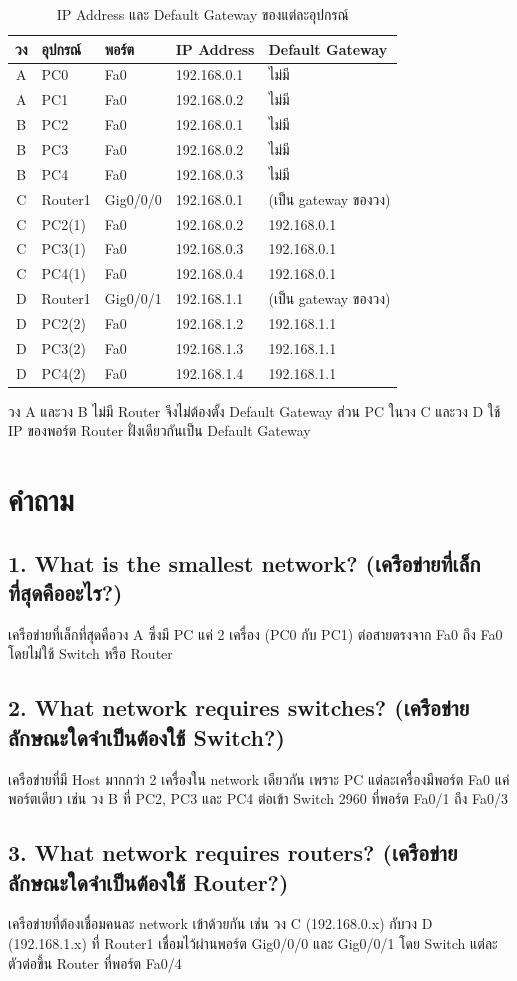 \begin{table}[h]
  \centering
  \caption{IP Address และ Default Gateway ของแต่ละอุปกรณ์}
  \label{tab:ip}
  \begin{tabular}{cllll}
    \toprule
    วง & อุปกรณ์ & พอร์ต & IP Address & Default Gateway \\
    \midrule
    A & PC0     & Fa0      & 192.168.0.1 & ไม่มี \\
    A & PC1     & Fa0      & 192.168.0.2 & ไม่มี \\
    \midrule
    B & PC2     & Fa0      & 192.168.0.1 & ไม่มี \\
    B & PC3     & Fa0      & 192.168.0.2 & ไม่มี \\
    B & PC4     & Fa0      & 192.168.0.3 & ไม่มี \\
    \midrule
    C & Router1 & Gig0/0/0 & 192.168.0.1 & (เป็น gateway ของวง) \\
    C & PC2(1)  & Fa0      & 192.168.0.2 & 192.168.0.1 \\
    C & PC3(1)  & Fa0      & 192.168.0.3 & 192.168.0.1 \\
    C & PC4(1)  & Fa0      & 192.168.0.4 & 192.168.0.1 \\
    \midrule
    D & Router1 & Gig0/0/1 & 192.168.1.1 & (เป็น gateway ของวง) \\
    D & PC2(2)  & Fa0      & 192.168.1.2 & 192.168.1.1 \\
    D & PC3(2)  & Fa0      & 192.168.1.3 & 192.168.1.1 \\
    D & PC4(2)  & Fa0      & 192.168.1.4 & 192.168.1.1 \\
    \bottomrule
  \end{tabular}
\end{table}

วง A และวง B ไม่มี Router จึงไม่ต้องตั้ง Default Gateway ส่วน PC ในวง C และวง D ใช้ IP ของพอร์ต Router ฝั่งเดียวกันเป็น Default Gateway

\section{คำถาม}

\subsection*{1. What is the smallest network? (เครือข่ายที่เล็กที่สุดคืออะไร?)}
เครือข่ายที่เล็กที่สุดคือวง A ซึ่งมี PC แค่ 2 เครื่อง (PC0 กับ PC1) ต่อสายตรงจาก Fa0 ถึง Fa0 โดยไม่ใช้ Switch หรือ Router

\subsection*{2. What network requires switches? (เครือข่ายลักษณะใดจำเป็นต้องใช้ Switch?)}
เครือข่ายที่มี Host มากกว่า 2 เครื่องใน network เดียวกัน เพราะ PC แต่ละเครื่องมีพอร์ต Fa0 แค่พอร์ตเดียว เช่น วง B ที่ PC2, PC3 และ PC4 ต่อเข้า Switch 2960 ที่พอร์ต Fa0/1 ถึง Fa0/3

\subsection*{3. What network requires routers? (เครือข่ายลักษณะใดจำเป็นต้องใช้ Router?)}
เครือข่ายที่ต้องเชื่อมคนละ network เข้าด้วยกัน เช่น วง C (192.168.0.x) กับวง D (192.168.1.x) ที่ Router1 เชื่อมไว้ผ่านพอร์ต Gig0/0/0 และ Gig0/0/1 โดย Switch แต่ละตัวต่อขึ้น Router ที่พอร์ต Fa0/4
